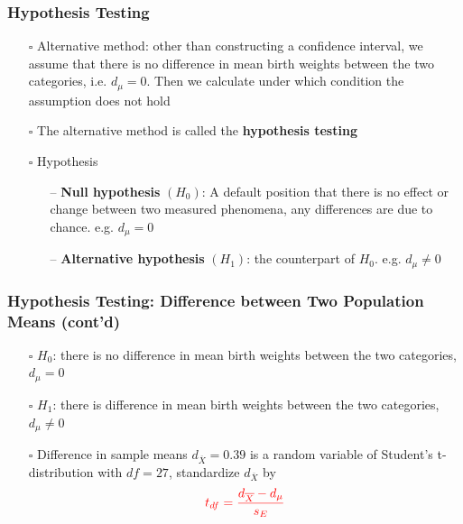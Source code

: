 \documentclass[handout]{beamer}
\begin{document}
\begin{frame}
    \frametitle{Hypothesis Testing}
    \vspace{-5pt}
    \begin{itemize}[wide = 0pt]
        \item[$\square$] Alternative method: other than constructing a confidence interval, we assume that there is no difference in mean birth weights between the two categories, i.e. $d_{\mu}=0$. Then we calculate under which condition the assumption does not hold
        \item[$\square$] The alternative method is called the \textbf{\color{red}hypothesis testing}
        \item[$\square$] Hypothesis
        \begin{itemize}
            \item[--] \textbf{\color{red}Null hypothesis} $(H_0)$: A default position that there is no effect or change between two measured phenomena, any differences are due to chance. e.g. $d_{\mu}=0$
            \item[--] \textbf{Alternative hypothesis} $(H_1)$: the counterpart of $H_0$. e.g. $d_{\mu}\neq 0$
        \end{itemize}
    \end{itemize}
    \vspace*{\fill}
\end{frame}

\begin{frame}
    \frametitle{Hypothesis Testing: Difference between Two Population Means (cont'd)}
    \begin{itemize}[wide = 0pt]
        \item[$\square$] $H_0$: there is no difference in mean birth weights between the two categories, $d_{\mu}=0$
        \item[$\square$] $H_1$: there is difference in mean birth weights between the two categories, $d_{\mu}\neq 0$
        \item[$\square$] Difference in sample means $d_{\overline{X}}=0.39$ is a random variable of Student's t-distribution with $df=27$, standardize $d_{\overline{X}}$ by
        \begin{equation*}
            {\color{red}t_{df}=\frac{d_{\overline{X}}-d_{\mu}}{s_E}}
        \end{equation*}
    \end{itemize} 
    \vspace*{\fill}
\end{frame}
\end{document}
